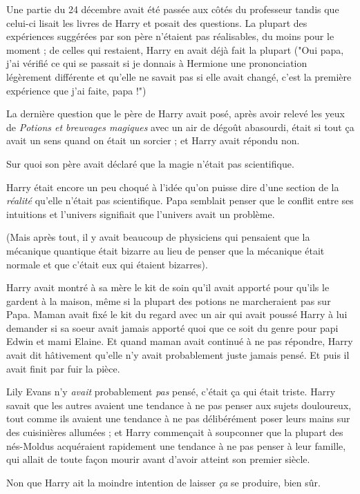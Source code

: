 Une partie du 24 décembre avait été passée aux côtés du professeur tandis que celui-ci lisait les livres de Harry et posait des questions. La plupart des expériences suggérées par son père n'étaient pas réalisables, du moins pour le moment ; de celles qui restaient, Harry en avait déjà fait la plupart ("Oui papa, j'ai vérifié ce qui se passait si je donnais à Hermione une prononciation légèrement différente et qu'elle ne savait pas si elle avait changé, c'est la première expérience que j'ai faite, papa !")

La dernière question que le père de Harry avait posé, après avoir relevé les yeux de \emph{Potions et breuvages magiques}  avec un air de dégoût abasourdi, était si tout ça avait un sens quand on était un sorcier ; et Harry avait répondu non.

Sur quoi son père avait déclaré que la magie n'était pas scientifique.

Harry était encore un peu choqué à l'idée qu'on puisse dire d'une section de la \emph{réalité}  qu'elle n'était pas scientifique. Papa semblait penser que le conflit entre ses intuitions et l'univers signifiait que l'univers avait un problème.

(Mais après tout, il y avait beaucoup de physiciens qui pensaient que la mécanique quantique était bizarre au lieu de penser que la mécanique était normale et que c'était eux qui étaient bizarres).

Harry avait montré à sa mère le kit de soin qu'il avait apporté pour qu'ils le gardent à la maison, même si la plupart des potions ne marcheraient pas sur Papa. Maman avait fixé le kit du regard avec un air qui avait poussé Harry à lui demander si sa soeur avait jamais apporté quoi que ce soit du genre pour papi Edwin et mami Elaine. Et quand maman avait continué à ne pas répondre, Harry avait dit hâtivement qu'elle n'y avait probablement juste jamais pensé. Et puis il avait finit par fuir la pièce.

Lily Evans n'y \emph{avait } probablement \emph{pas}  pensé, c'était ça qui était triste. Harry savait que les autres avaient une tendance à ne pas penser aux sujets douloureux, tout comme ils avaient une tendance à ne pas délibérément poser leurs mains sur des cuisinières allumées ; et Harry commençait à soupconner que la plupart des nés-Moldus acquéraient rapidement une tendance à ne pas penser à leur famille, qui allait de toute façon mourir avant d'avoir atteint son premier siècle.

Non que Harry ait la moindre intention de laisser \emph{ça } se produire, bien sûr.

